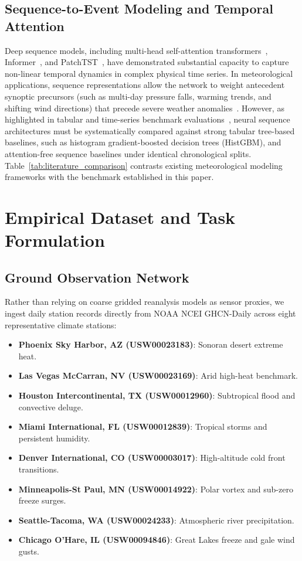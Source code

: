 \documentclass[conference]{IEEEtran}
\begin{document}
\subsection{Sequence-to-Event Modeling and Temporal Attention}
Deep sequence models, including multi-head self-attention transformers~\cite{vaswani2017}, Informer~\cite{zhou2021informer}, and PatchTST~\cite{nie2023patchtst}, have demonstrated substantial capacity to capture non-linear temporal dynamics in complex physical time series. In meteorological applications, sequence representations allow the network to weight antecedent synoptic precursors (such as multi-day pressure falls, warming trends, and shifting wind directions) that precede severe weather anomalies~\cite{schultz2021,chattopadhyay2020}. However, as highlighted in tabular and time-series benchmark evaluations~\cite{grinsztajn2022why,shwartzziv2022tabular}, neural sequence architectures must be systematically compared against strong tabular tree-based baselines, such as histogram gradient-boosted decision trees (HistGBM), and attention-free sequence baselines under identical chronological splits. Table~\ref{tab:literature_comparison} contrasts existing meteorological modeling frameworks with the benchmark established in this paper.



\section{Empirical Dataset and Task Formulation}
\label{sec:data}
\subsection{Ground Observation Network}
Rather than relying on coarse gridded reanalysis models as sensor proxies, we ingest daily station records directly from NOAA NCEI GHCN-Daily across eight representative climate stations:
\begin{itemize}
    \item \textbf{Phoenix Sky Harbor, AZ (USW00023183)}: Sonoran desert extreme heat.
    \item \textbf{Las Vegas McCarran, NV (USW00023169)}: Arid high-heat benchmark.
    \item \textbf{Houston Intercontinental, TX (USW00012960)}: Subtropical flood and convective deluge.
    \item \textbf{Miami International, FL (USW00012839)}: Tropical storms and persistent humidity.
    \item \textbf{Denver International, CO (USW00003017)}: High-altitude cold front transitions.
    \item \textbf{Minneapolis-St Paul, MN (USW00014922)}: Polar vortex and sub-zero freeze surges.
    \item \textbf{Seattle-Tacoma, WA (USW00024233)}: Atmospheric river precipitation.
    \item \textbf{Chicago O'Hare, IL (USW00094846)}: Great Lakes freeze and gale wind gusts.
\end{itemize}
\end{document}
